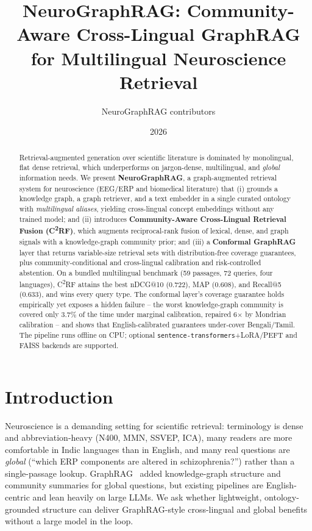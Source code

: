\documentclass[10pt,twocolumn]{article}
\title{\textbf{NeuroGraphRAG: Community-Aware Cross-Lingual GraphRAG\\ for Multilingual Neuroscience Retrieval}}
\author{NeuroGraphRAG contributors}
\date{2026}
\begin{document}
\maketitle

\begin{abstract}
Retrieval-augmented generation over scientific literature is dominated by monolingual, flat dense
retrieval, which underperforms on jargon-dense, multilingual, and \emph{global} information needs. We
present \textbf{NeuroGraphRAG}, a graph-augmented retrieval system for neuroscience (EEG/ERP and
biomedical literature) that (i) grounds a knowledge graph, a graph retriever, and a text embedder in a
single curated ontology with \emph{multilingual aliases}, yielding cross-lingual concept embeddings
without any trained model; and (ii) introduces \textbf{Community-Aware Cross-Lingual Retrieval Fusion
(C\textsuperscript{2}RF)}, which augments reciprocal-rank fusion of lexical, dense, and graph signals
with a knowledge-graph community prior; and (iii) a \textbf{Conformal GraphRAG} layer that returns
variable-size retrieval sets with distribution-free coverage guarantees, plus community-conditional and
cross-lingual calibration and risk-controlled abstention. On a bundled multilingual benchmark (59
passages, 72 queries, four languages), C\textsuperscript{2}RF attains the best nDCG@10 (0.722), MAP
(0.608), and Recall@5 (0.633), and wins every query type. The conformal layer's coverage guarantee holds
empirically yet exposes a hidden failure -- the worst knowledge-graph community is covered only 3.7\% of
the time under marginal calibration, repaired 6$\times$ by Mondrian calibration -- and shows that
English-calibrated guarantees under-cover Bengali/Tamil. The pipeline runs offline on CPU; optional
\texttt{sentence-transformers}+LoRA/PEFT and FAISS backends are supported.
\end{abstract}

\section{Introduction}
Neuroscience is a demanding setting for scientific retrieval: terminology is dense and
abbreviation-heavy (N400, MMN, SSVEP, ICA), many readers are more comfortable in Indic languages than in
English, and many real questions are \emph{global} (``which ERP components are altered in
schizophrenia?'') rather than a single-passage lookup. GraphRAG~\cite{edge2024graphrag} added
knowledge-graph structure and community summaries for global questions, but existing pipelines are
English-centric and lean heavily on large LLMs. We ask whether lightweight, ontology-grounded structure
can deliver GraphRAG-style cross-lingual and global benefits without a large model in the loop.
\end{document}

